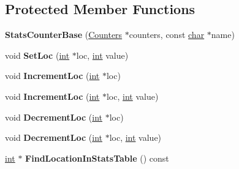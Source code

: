 \subsection*{Protected Member Functions}
\begin{DoxyCompactItemize}
\item 
\mbox{\label{classv8_1_1internal_1_1StatsCounterBase_a214d40a20de746972ac2f7f020825fa0}} 
{\bfseries Stats\+Counter\+Base} (\mbox{\hyperlink{classv8_1_1internal_1_1Counters}{Counters}} $\ast$counters, const \mbox{\hyperlink{classchar}{char}} $\ast$name)
\item 
\mbox{\label{classv8_1_1internal_1_1StatsCounterBase_ae9f13c25f910c441dca198ed8cb92fca}} 
void {\bfseries Set\+Loc} (\mbox{\hyperlink{classint}{int}} $\ast$loc, \mbox{\hyperlink{classint}{int}} value)
\item 
\mbox{\label{classv8_1_1internal_1_1StatsCounterBase_a102fa7c004e29d1fa63abf991b9bb3aa}} 
void {\bfseries Increment\+Loc} (\mbox{\hyperlink{classint}{int}} $\ast$loc)
\item 
\mbox{\label{classv8_1_1internal_1_1StatsCounterBase_a16f5f4ed0aca5d52ff8d53244afa477a}} 
void {\bfseries Increment\+Loc} (\mbox{\hyperlink{classint}{int}} $\ast$loc, \mbox{\hyperlink{classint}{int}} value)
\item 
\mbox{\label{classv8_1_1internal_1_1StatsCounterBase_a92f92359cbe321a5aade27e4e6873bf4}} 
void {\bfseries Decrement\+Loc} (\mbox{\hyperlink{classint}{int}} $\ast$loc)
\item 
\mbox{\label{classv8_1_1internal_1_1StatsCounterBase_a15e95bc6e3a80c2b8cf002097497ed3a}} 
void {\bfseries Decrement\+Loc} (\mbox{\hyperlink{classint}{int}} $\ast$loc, \mbox{\hyperlink{classint}{int}} value)
\item 
\mbox{\label{classv8_1_1internal_1_1StatsCounterBase_ae3cac99707815dcf7cd62730d36b71b3}} 
\mbox{\hyperlink{classint}{int}} $\ast$ {\bfseries Find\+Location\+In\+Stats\+Table} () const
\end{DoxyCompactItemize}
